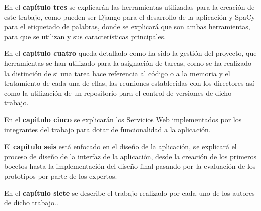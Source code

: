 En el \textbf{capítulo tres} se explicarán las herramientas utilizadas para la creación de este trabajo, como pueden ser Django para el desarrollo de la aplicación y SpaCy para el etiquetado de palabras, donde se explicará que son ambas herramientas, para que se utilizan y sus características principales.

En el \textbf{capitulo cuatro} queda detallado como ha sido la gestión del proyecto, que herramientas se han utilizado para la asignación de tareas, como se ha realizado la distinción de si una tarea hace referencia al código o a la memoria y el tratamiento de cada una de ellas, las reuniones establecidas con los directores así como la utilización de un repositorio para el control de versiones de dicho trabajo.

En el \textbf{capitulo cinco} se explicarán los Servicios Web implementados por los integrantes del trabajo para dotar de funcionalidad a la aplicación.

El \textbf{capítulo seis} está enfocado en el diseño de la aplicación, se explicará el proceso de diseño de la interfaz de la aplicación, desde la creación de los primeros bocetos hasta la implementación del diseño final pasando por la evaluación de los prototipos por parte de los expertos.
 
En el \textbf{capítulo siete} se describe el trabajo realizado por cada uno de los autores de dicho trabajo..